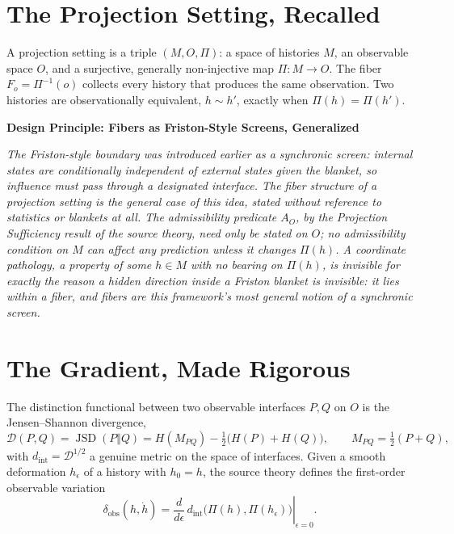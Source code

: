 \documentclass[11pt,fleqn]{book}
\numberwithin{equation}{chapter}
\newenvironment{principle}[1]
  {\begin{principleEnv}
   \noindent\textbf{Design Principle: #1}\par\smallskip\itshape}
  {\end{principleEnv}}
\theoremstyle{plain}
\theoremstyle{definition}
\theoremstyle{remark}
\begin{document}
\section{The Projection Setting, Recalled}

A projection setting is a triple \((M,O,\Pi)\): a space of histories \(M\), an observable space \(O\), and a surjective, generally non-injective map \(\Pi:M\to O\). The fiber \(F_o=\Pi^{-1}(o)\) collects every history that produces the same observation. Two histories are observationally equivalent, \(h\sim h'\), exactly when \(\Pi(h)=\Pi(h')\).

\begin{principle}{Fibers as Friston-Style Screens, Generalized}
The Friston-style boundary was introduced earlier as a synchronic screen: internal states are conditionally independent of external states given the blanket, so influence must pass through a designated interface. The fiber structure of a projection setting is the general case of this idea, stated without reference to statistics or blankets at all. The admissibility predicate \(A_O\), by the Projection Sufficiency result of the source theory, need only be stated on \(O\); no admissibility condition on \(M\) can affect any prediction unless it changes \(\Pi(h)\). A coordinate pathology, a property of some \(h\in M\) with no bearing on \(\Pi(h)\), is invisible for exactly the reason a hidden direction inside a Friston blanket is invisible: it lies within a fiber, and fibers are this framework's most general notion of a synchronic screen.
\end{principle}

\section{The Gradient, Made Rigorous}

The distinction functional between two observable interfaces \(P,Q\) on \(O\) is the Jensen--Shannon divergence,
\begin{equation}
\mathcal D(P,Q) = \operatorname{JSD}(P\Vert Q) = H(M_{PQ}) - \tfrac12\bigl(H(P)+H(Q)\bigr), \qquad M_{PQ}=\tfrac12(P+Q),
\end{equation}
with \(d_{\mathrm{int}}=\mathcal D^{1/2}\) a genuine metric on the space of interfaces. Given a smooth deformation \(h_\epsilon\) of a history with \(h_0=h\), the source theory defines the first-order observable variation
\begin{equation}
\delta_{\mathrm{obs}}(h,\dot h) = \left.\frac{d}{d\epsilon}\, d_{\mathrm{int}}\bigl(\Pi(h),\Pi(h_\epsilon)\bigr)\right|_{\epsilon=0}.
\end{equation}
\end{document}
